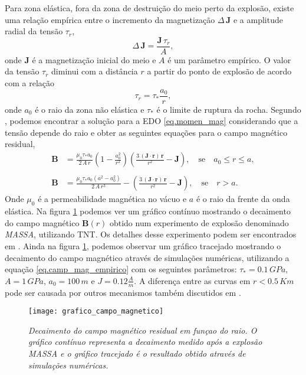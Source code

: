 Para zona el\'astica, fora da zona de destrui\c{c}\~ao do meio perto da explos\~ao, existe uma rela\c{c}\~ao emp\'irica entre o incremento da magnetiza\c{c}\~ao $\Delta\,\mathbf{J}$ e a amplitude radial da tens\~ao $\tau_r$,
\begin{equation}\label{eq.momen_mag}
\Delta\,\mathbf{J}=\frac{\mathbf{J}\,\tau_r}{A},
\end{equation}
onde $\mathbf{J}$ \'e a magnetiza\c{c}\~ao inicial do meio e $A$ \'e um par\^ametro emp\'irico. O valor da tens\~ao $\tau_r$ diminui com a dist\^ancia $r$ a partir do ponto de explos\~ao de acordo com a rela\c{c}\~ao
\begin{equation}
\tau_r=\tau_*\frac{a_0}{r},
\end{equation}
onde $a_0$ \'e o raio da zona n\~ao el\'astica e $\tau_*$ \'e o limite de ruptura da rocha. Segundo \cite{surkov_89a}, podemos encontrar a solu\c{c}\~ao para a EDO \ref{eq.momen_mag} considerando que a tens\~ao depende do raio e obter as seguintes equa\c{c}\~oes para o campo magn\'etico residual,
\begin{align}\label{eq.camp_mag_empirico}
\mathbf{B}&=\frac{\mu_0\tau_*a_0}{2\,A\,r}\left(1-\frac{a_0^2}{r^2}\right)\left(\frac{3\,(\mathbf{J}\cdot \mathbf{r})\,\mathbf{r}}{r^2}-\mathbf{J}\right),\quad\text{se}\quad a_0\leq r\leq a,\\\nonumber\\
\mathbf{B}&=\frac{\mu_0\tau_*a_0(a^2-a_0^2)}{2\,A\,r^3}-\left(\frac{3\,(\mathbf{J}\cdot \mathbf{r})\,\mathbf{r}}{r^2}-\mathbf{J}\right),\quad\text{se}\quad r>a.
\end{align}
Onde $\mu_0$ \'e a permeabilidade magn\'etica no v\'acuo e $a$ \'e o raio da frente da onda el\'astica. Na figura \ref{fig.decai_camp_mag} podemos ver um gr\'afico cont\'inuo mostrando o decaimento do campo magn\'etico $\mathbf{B}(r)$ obtido num experimento de explos\~ao denominado \textit{MASSA}, utilizando TNT. Os detalhes desse experimento podem ser encontrados em \cite{yerzhanov_85}. Ainda na figura \ref{fig.decai_camp_mag}, podemos observar um gr\'afico tracejado mostrando o decaimento do campo magn\'etico atrav\'es de simula\c{c}\~oes num\'ericas, utilizando a equa\c{c}\~ao \ref{eq.camp_mag_empirico} com os seguintes par\^ametros: $\tau_*=0.1\,GPa$, $A=1\,GPa$, $a_0=100\,m$ e $J=0.12\frac{A}{m}$. A diferen\c{c}a entre as curvas em $r<0.5\,Km$ pode ser causada por outros mecanismos tamb\'em discutidos em \cite{surkov_97}.
\begin{figure}
\centering
\texttt{[image: grafico\_campo\_magnetico]}
\caption{\textit{Decaimento do campo magn\'etico residual em fun\c{c}ao do raio. O gr\'afico cont\'inuo representa a decaimento medido ap\'os a explos\~ao MASSA e o gr\'afico tracejado \'e o resultado obtido atrav\'es de simula\c{c}\~oes num\'ericas.}}
\label{fig.decai_camp_mag}
\end{figure}


